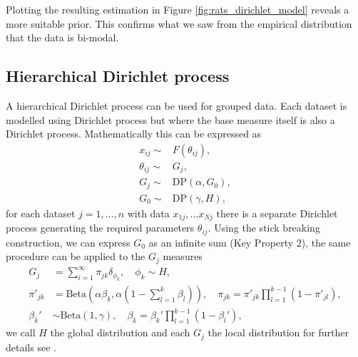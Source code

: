 \documentclass[nojss]{jss}
\begin{document}
\begin{Schunk}
\end{Schunk}

Plotting the resulting estimation in Figure \ref{fig:rats_dirichlet_model} reveals a more suitable prior. This confirms what we saw from the empirical distribution that the data is bi-modal.

\subsection{Hierarchical Dirichlet process}
A hierarchical Dirichlet process can be used for grouped data. Each dataset is modelled using Dirichlet process but where the base measure itself is also a Dirichlet process. Mathematically this can be expressed as
\begin{align*}
x_{ij}  \sim & F(\theta _{ij}), \\
\theta _{ij} \sim & G_j, \\
G_j \sim & \text{DP} (\alpha , G_0 ), \\
G_0 \sim & \text{DP} (\gamma, H),
\end{align*}
for each dataset $j=1, \dots,n$ with data $x_{1j}, \ldots x_{Nj}$ there is a separate Dirichlet process generating the required parameters $\theta _{ij}$. Using the stick breaking construction, we can express $G_0$ as an infinite sum (Key Property 2), the same procedure can be applied to the $G_j$ measures
\begin{align*}
G_j & = \sum _{i=1} ^\infty \pi _{jk} \delta _{\phi _k}, \quad \phi _k  \sim H, \\
\pi ' _{jk} & = \text{Beta}  \left( \alpha \beta _k , \alpha \left( 1 - \sum _{l=1} ^k \beta _l \right) \right), \quad
\pi _{jk}  = \pi ' _{jk} \prod _{l=1} ^{k-1} ( 1- \pi ' _{jl} ), \\
\beta _k ' &  \sim  \text{Beta} \left(1, \gamma \right), \quad
\beta _k  = \beta _k ' \prod_ {l=1} ^{k-1} (1 - \beta _l '),
\end{align*}
we call $H$ the global distribution and each $G_j$ the local distribution for further details see \cite{teh_sharing_2005}.
\end{document}
